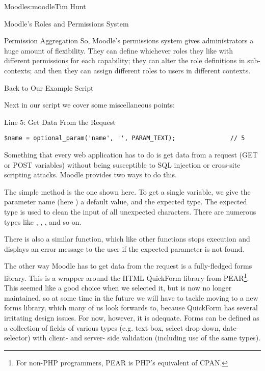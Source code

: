\begin{aosachapter}{Moodle}{s:moodle}{Tim Hunt}
\begin{aosasect1}{Moodle's Roles and Permissions System}
\begin{aosasect2}{Permission Aggregation}
So, Moodle's permissions system gives administrators a huge amount of
flexibility. They can define whichever roles they like with different
permissions for each capability; they can alter the role definitions
in sub-contexts; and then they can assign different roles to users in
different contexts.

\end{aosasect2}

\end{aosasect1}

\begin{aosasect1}{Back to Our Example Script}

Next in our script we cover some miscellaneous points:

\begin{aosasect2}{Line 5: Get Data From the Request}

\begin{verbatim}
$name = optional_param('name', '', PARAM_TEXT);               // 5
\end{verbatim}

Something that every web application has to do is get data from a
request (GET or POST variables) without being susceptible to SQL
injection or cross-site scripting attacks. Moodle provides two ways to
do this.

The simple method is the one shown here. To get a single variable, we
give the parameter name (here ) a default value, and the
expected type. The expected type is used to clean the input of all
unexpected characters. There are numerous types like
, , , and so
on.

There is also a similar  function, which like
other  functions stops execution and displays
an error message to the user if the expected parameter is not found.

The other way Moodle has to get data from the request is a
fully-fledged forms library. This is a wrapper around the HTML
QuickForm library from PEAR\footnote{For non-PHP programmers, PEAR is
  PHP's equivalent of CPAN.}. This seemed like a good choice when we
selected it, but is now no longer maintained, so at some time in the
future we will have to tackle moving to a new forms library, which
many of us look forwards to, because QuickForm has several irritating
design issues. For now, however, it is adequate. Forms can be defined
as a collection of fields of various types (e.g. text box, select
drop-down, date-selector) with client- and server- side validation
(including use of the same  types).


\end{aosasect2}
\end{aosasect1}
\end{aosachapter}
